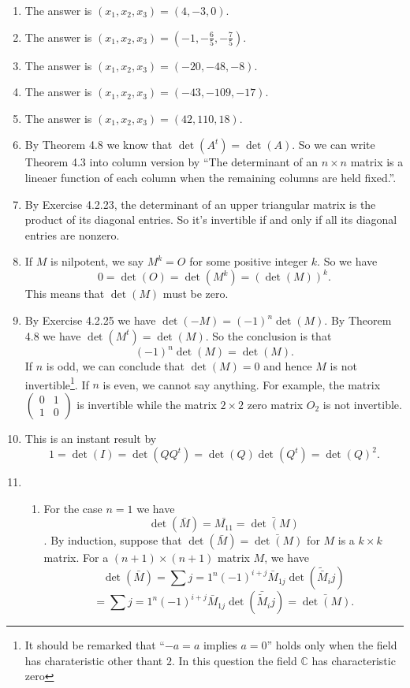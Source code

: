 \begin{enumerate}
\[\begin{array}{cc}
\end{array}\right.\]
\item The answer is $(x_1,x_2,x_3)=(4,-3,0)$.
\item The answer is $(x_1,x_2,x_3)=(-1,-\frac{6}{5},-\frac{7}{5})$.
\item The answer is $(x_1,x_2,x_3)=(-20,-48,-8)$.
\item The answer is $(x_1,x_2,x_3)=(-43,-109,-17)$.
\item The answer is $(x_1,x_2,x_3)=(42,110,18)$.
\item By Theorem 4.8 we know that $\det(A^t)=\det(A)$. So we can write Theorem 4.3 into column version by ``The determinant of an $n\times n$ matrix is a lineaer function of each column when the remaining columns are held fixed.''.
\item By Exercise 4.2.23, the determinant of an upper triangular matrix is the product of its diagonal entries. So it's invertible if and only if all its diagonal entries are nonzero.
\item If $M$ is nilpotent, we say $M^k=O$ for some positive integer $k$. So we have \[0=\det(O)=\det(M^k)=(\det(M))^k.\] This means that $\det(M)$ must be zero.
\item By Exercise 4.2.25 we have $\det(-M)=(-1)^n\det(M)$. By Theorem 4.8 we have $\det(M^t)=\det(M)$. So the conclusion is that 
\[(-1)^n\det(M)=\det(M).\]
If $n$ is odd, we can conclude that $\det(M)=0$ and hence $M$ is not invertible\footnote{It should be remarked that ``$-a=a$ implies $a=0$'' holds only when the field has charateristic other thant $2$. In this question the field $\mathbb{C}$ has characteristic zero}. If $n$ is even, we cannot say anything. For example, the matrix $\begin{pmatrix}0&1\\1&0\end{pmatrix}$ is invertible while the matrix $2\times 2$ zero matrix $O_2$ is not invertible.
\item This is an instant result by \[1=\det(I)=\det(QQ^t)=\det(Q)\det(Q^t)=\det(Q)^2.\]
\item \begin{enumerate}
\item For the case $n=1$ we have \[\det(\bar{M})=\bar{M_{11}}=\bar{\det(M)}\]. By induction, suppose that $\det(\bar{M})=\bar{\det(M)}$ for $M$ is a $k\times k$ matrix. For a $(n+1)\times (n+1)$ matrix $M$, we have 
\[\det(\bar{M})=\sum{j=1}^n{(-1)^{i+j}\bar{M}_{1j}\det(\tilde{\bar{M}}_ij)}\]
\[=\sum{j=1}^n{(-1)^{i+j}\bar{M}_{1j}\det(\bar{\tilde{M}}_ij)}=\bar{\det(M)}.\]

\end{enumerate}
\end{enumerate}
